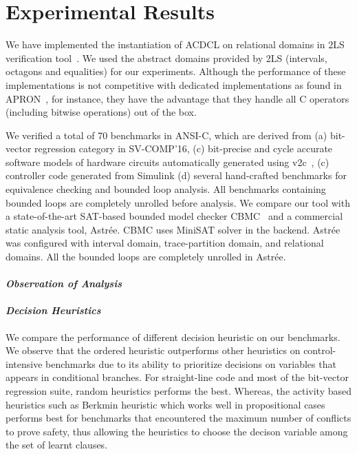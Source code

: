 \section{Experimental Results}
We have implemented the instantiation of ACDCL on relational domains
in 2LS verification tool~\cite{2ls}.  We used the abstract domains
provided by 2LS (intervals, octagons and equalities) for our
experiments. Although the performance of these implementations is not
competitive with dedicated implementations as found in
APRON~\cite{apron}, for instance, they have the advantage that they
handle all C operators (including bitwise operations) out of the box.

We verified a total of 70 benchmarks in ANSI-C, which are derived from 
(a) bit-vector regression category in SV-COMP'16, (c) bit-precise and 
cycle accurate software models of hardware circuits automatically 
generated using v2c~\cite{mtk2016}, (c) controller code generated 
from Simulink (d) several hand-crafted benchmarks for equivalence 
checking and bounded loop analysis.  All benchmarks containing 
bounded loops are completely unrolled before analysis.  We compare 
our tool with a state-of-the-art SAT-based bounded model checker 
CBMC~\cite{cbmc} and a commercial static analysis tool, Astr{\'e}e.  
CBMC uses MiniSAT solver in the backend.  Astr{\'e}e was configured with 
interval domain, trace-partition domain, and relational domains.  
All the bounded loops are completely unrolled in Astr{\'e}e.   

\paragraph {\em \textbf{Observation of Analysis}}

\paragraph {\em \textbf{Decision Heuristics}} We compare the performance of 
different decision heuristic on our benchmarks.  We observe that 
the ordered heuristic outperforms other heuristics on control-intensive 
benchmarks due to its ability to prioritize decisions on variables that 
appears in conditional branches.  For straight-line code and most of 
the bit-vector regression suite, random heuristics performs the best.  
Whereas, the activity based heuristics such as Berkmin heuristic which 
works well in propositional cases performs best for benchmarks that 
encountered the maximum number of conflicts to prove safety, thus allowing 
the heuristics to choose the decison variable among the set of learnt clauses.   

